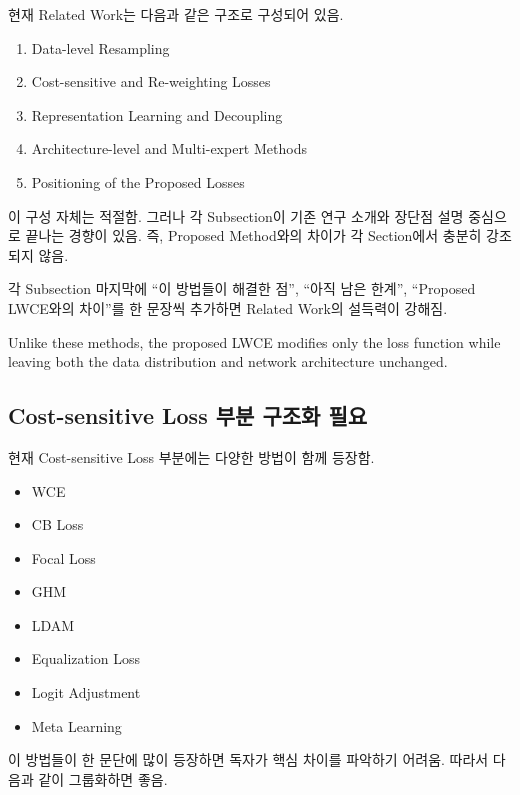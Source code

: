 \documentclass[11pt,a4paper]{article}
\begin{document}
현재 Related Work는 다음과 같은 구조로 구성되어 있음.

\begin{enumerate}
\item Data-level Resampling
\item Cost-sensitive and Re-weighting Losses
\item Representation Learning and Decoupling
\item Architecture-level and Multi-expert Methods
\item Positioning of the Proposed Losses
\end{enumerate}

이 구성 자체는 적절함. 그러나 각 Subsection이 기존 연구 소개와 장단점 설명 중심으로 끝나는 경향이 있음. 즉, Proposed Method와의 차이가 각 Section에서 충분히 강조되지 않음.

\begin{tcolorbox}[title=개선 방향]
각 Subsection 마지막에 ``이 방법들이 해결한 점'', ``아직 남은 한계'', ``Proposed LWCE와의 차이''를 한 문장씩 추가하면 Related Work의 설득력이 강해짐.
\end{tcolorbox}

\begin{tcolorbox}[title=추가 가능 문장 예시]
Unlike these methods, the proposed LWCE modifies only the loss function while leaving both the data distribution and network architecture unchanged.
\end{tcolorbox}

\subsection{Cost-sensitive Loss 부분 구조화 필요}

현재 Cost-sensitive Loss 부분에는 다양한 방법이 함께 등장함.

\begin{itemize}
\item WCE
\item CB Loss
\item Focal Loss
\item GHM
\item LDAM
\item Equalization Loss
\item Logit Adjustment
\item Meta Learning
\end{itemize}

이 방법들이 한 문단에 많이 등장하면 독자가 핵심 차이를 파악하기 어려움. 따라서 다음과 같이 그룹화하면 좋음.
\end{document}
